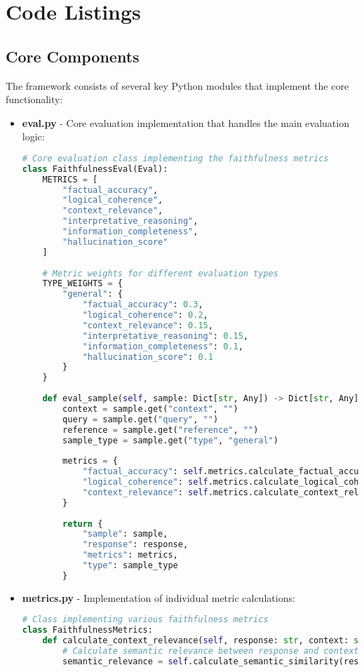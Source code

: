 \appendix
\section{Code Listings}

\subsection{Core Components}
The framework consists of several key Python modules that implement the core functionality:

\begin{itemize}
    \item \textbf{eval.py} - Core evaluation implementation that handles the main evaluation logic:
    \begin{lstlisting}[language=Python, breaklines=true, basicstyle=\ttfamily\scriptsize, commentstyle=\color{gray}]
# Core evaluation class implementing the faithfulness metrics
class FaithfulnessEval(Eval):
    METRICS = [
        "factual_accuracy",
        "logical_coherence",
        "context_relevance",
        "interpretative_reasoning",
        "information_completeness",
        "hallucination_score"
    ]
    
    # Metric weights for different evaluation types
    TYPE_WEIGHTS = {
        "general": {
            "factual_accuracy": 0.3,
            "logical_coherence": 0.2,
            "context_relevance": 0.15,
            "interpretative_reasoning": 0.15,
            "information_completeness": 0.1,
            "hallucination_score": 0.1
        }
    }
    
    def eval_sample(self, sample: Dict[str, Any]) -> Dict[str, Any]:
        context = sample.get("context", "")
        query = sample.get("query", "")
        reference = sample.get("reference", "")
        sample_type = sample.get("type", "general")
        
        metrics = {
            "factual_accuracy": self.metrics.calculate_factual_accuracy(response, reference),
            "logical_coherence": self.metrics.calculate_logical_coherence(response),
            "context_relevance": self.metrics.calculate_context_relevance(response, context)
        }
        
        return {
            "sample": sample,
            "response": response,
            "metrics": metrics,
            "type": sample_type
        }
    \end{lstlisting}

    \item \textbf{metrics.py} - Implementation of individual metric calculations:
    \begin{lstlisting}[language=Python, breaklines=true, basicstyle=\ttfamily\scriptsize, commentstyle=\color{gray}]
# Class implementing various faithfulness metrics
class FaithfulnessMetrics:
    def calculate_context_relevance(self, response: str, context: str) -> float:
        # Calculate semantic relevance between response and context
        semantic_relevance = self.calculate_semantic_similarity(response, context)
        

\end{lstlisting}
\end{itemize}
